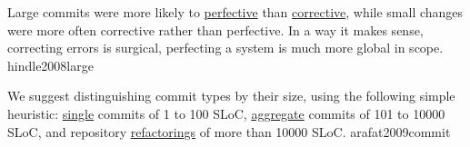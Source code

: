 \documentclass{article}
\begin{document}
  {Large commits were more likely to \ul{perfective} than \ul{corrective}, while small changes were more often corrective rather than perfective. In a way it makes sense, correcting errors is surgical, perfecting a system is much more global in scope.}
  {hindle2008large}


  {We suggest distinguishing commit types by their size, using the following simple heuristic: \ul{single} commits of 1 to 100 SLoC, \ul{aggregate} commits of 101 to 10000 SLoC, and repository \ul{refactorings} of more than 10000 SLoC.}
  {arafat2009commit}
\end{document}
